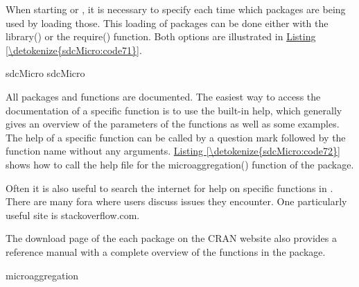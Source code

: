 \documentclass[letterpaper,10pt,english]{sphinxmanual}
\begin{document}
When starting  or , it is necessary to specify each time
which packages are being used by loading those. This loading of packages
can be done either with the library() or the require() function. Both
options are illustrated in \hyperref[\detokenize{sdcMicro:code71}]{Listing \ref{\detokenize{sdcMicro:code71}}}.

\def\sphinxLiteralBlockLabel{\label{\detokenize{sdcMicro:code71}}}
%
\begin{sphinxVerbatim}[commandchars=\\\{\},numbers=left,firstnumber=1,stepnumber=1]
sdcMicro 
sdcMicro 
\end{sphinxVerbatim}

All packages and functions are documented. The easiest way to access the
documentation of a specific function is to use the built-in help, which
generally gives an overview of the parameters of the functions as well
as some examples. The help of a specific function can be called by a
question mark followed by the function name without any arguments.
\hyperref[\detokenize{sdcMicro:code72}]{Listing \ref{\detokenize{sdcMicro:code72}}} shows how to call the help file for the microaggregation()
function of the  package. %
\begin{footnote}[1]\sphinxAtStartFootnote
Often it is also useful to search the internet for help on specific
functions in . There are many fora where  users discuss issues
they encounter. One particularly useful site is stackoverflow.com.
%
\end{footnote} The download
page of the each package on the CRAN website also provides a reference
manual with a complete overview of the functions in the package.

\def\sphinxLiteralBlockLabel{\label{\detokenize{sdcMicro:code72}}}
%
\begin{sphinxVerbatim}[commandchars=\\\{\},numbers=left,firstnumber=1,stepnumber=1]
microaggregation 
\end{sphinxVerbatim}
\end{document}
